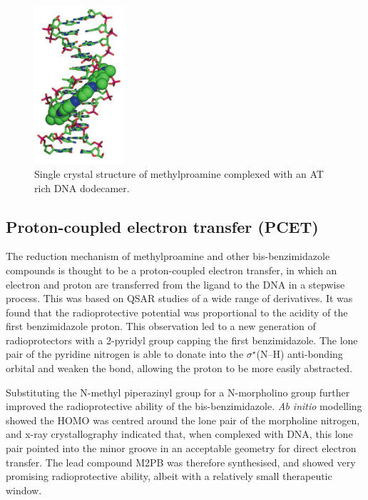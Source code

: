 \begin{refsection}
\begin{figure}
\includegraphics[width=0.3\textwidth]{Figures/mpa-dna-crystal.png}
\caption{Single crystal structure of methylproamine complexed with an AT rich DNA dodecamer.}\label{fig:mpa-dna-crystal}
\end{figure}

\subsection{Proton-coupled electron transfer (PCET)}
The reduction mechanism of methylproamine and other bis-benzimidazole compounds is thought to be a proton-coupled electron transfer, in which an electron and proton are transferred from the ligand to the DNA in a stepwise process.
This was based on QSAR studies of a wide range of derivatives\autocite{Kakkar2005}.
It was found that the radioprotective potential was proportional to the acidity of the first benzimidazole proton.
This observation led to a new generation of radioprotectors with a 2-pyridyl group capping the first benzimidazole.
The lone pair of the pyridine nitrogen is able to donate into the $\sigma^{\star}$(N--H) anti-bonding orbital and weaken the bond, allowing the proton to be more easily abstracted.

Substituting the N-methyl piperazinyl group for a N-morpholino group further improved the radioprotective ability of the bis-benzimidazole.
\emph{Ab initio} modelling showed the HOMO was centred around the lone pair of the morpholine nitrogen, and x-ray crystallography indicated that, when complexed with DNA, this lone pair pointed into the minor groove in an acceptable geometry for direct electron transfer.
The lead compound M2PB  was therefore synthesised, and showed very promising radioprotective ability, albeit with a relatively small therapeutic window.


\end{refsection}
